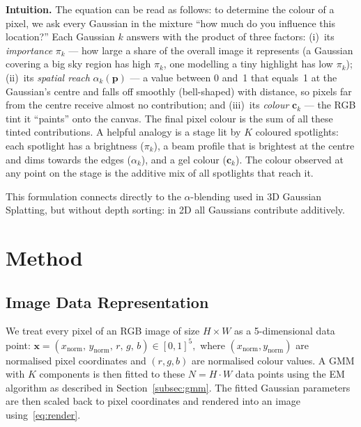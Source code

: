 \documentclass[a4paper,conference]{IEEEtran}
\begin{document}
\textbf{Intuition.}
The equation can be read as follows: to determine the colour of a pixel, we
ask every Gaussian in the mixture ``how much do you influence this location?''
Each Gaussian $k$ answers with the product of three factors:
(i)~its \emph{importance} $\pi_k$ --- how large a share of the overall image it
represents (a Gaussian covering a big sky region has high $\pi_k$, one modelling
a tiny highlight has low $\pi_k$);
(ii)~its \emph{spatial reach} $\alpha_k(\mathbf{p})$ --- a value between 0 and~1
that equals~1 at the Gaussian's centre and falls off smoothly (bell-shaped) with
distance, so pixels far from the centre receive almost no contribution; and
(iii)~its \emph{colour} $\mathbf{c}_k$ --- the RGB tint it ``paints'' onto the canvas.
The final pixel colour is the sum of all these tinted contributions.
A helpful analogy is a stage lit by $K$ coloured spotlights: each spotlight has
a brightness ($\pi_k$), a beam profile that is brightest at the centre and dims
towards the edges ($\alpha_k$), and a gel colour ($\mathbf{c}_k$).
The colour observed at any point on the stage is the additive mix of all
spotlights that reach it.

This formulation connects directly to the $\alpha$-blending used in 3D Gaussian
Splatting, but without depth sorting: in 2D all Gaussians contribute additively.


\section{Method}
\label{sec:method}

\subsection{Image Data Representation}
\label{subsec:data}

We treat every pixel of an RGB image of size $H\times W$ as a 5-dimensional
data point:
$\mathbf{x} = (x_{\mathrm{norm}},\, y_{\mathrm{norm}},\, r,\, g,\, b) \in [0,1]^5,$
where $(x_{\mathrm{norm}}, y_{\mathrm{norm}})$ are normalised pixel coordinates
and $(r,g,b)$ are normalised colour values.
A GMM with $K$ components is then fitted to these $N = H\cdot W$ data
points using the EM algorithm as described in Section~\ref{subsec:gmm}.
The fitted Gaussian parameters are then scaled back to pixel coordinates
and rendered into an image using~\eqref{eq:render}.
\end{document}

